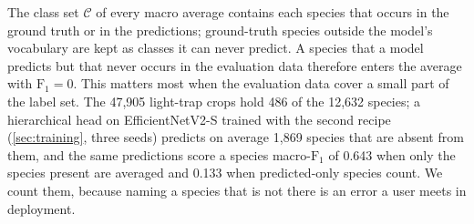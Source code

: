The class set $\mathcal{C}$ of every macro average contains each species that occurs in the ground truth or in the predictions; ground-truth species outside the model's vocabulary are kept as classes it can never predict.
A species that a model predicts but that never occurs in the evaluation data therefore enters the average with $\text{F}_1 = 0$.
This matters most when the evaluation data cover a small part of the label set.
The 47,905 light-trap crops hold 486 of the 12,632 species; a hierarchical head on EfficientNetV2-S trained with the second recipe (\cref{sec:training}, three seeds) predicts on average 1,869 species that are absent from them, and the same predictions score a species macro-$\text{F}_1$ of 0.643 when only the species present are averaged and 0.133 when predicted-only species count.
We count them, because naming a species that is not there is an error a user meets in deployment.

